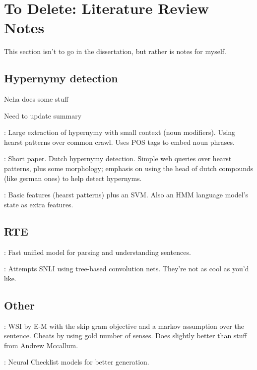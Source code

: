 \chapter{To Delete: Literature Review Notes}

{This section isn't to go in the dissertation, but rather is notes
for myself.}

\section{Hypernymy detection}

\cite{nayak:2015:techreport} Neha does some stuff

\cite{vylomova:2016:acl} Need to update summary

\cite{seitner:2016:lrec}: Large extraction of hypernymy with small context (noun
modifiers). Using hearst patterns over common crawl. Uses POS tags to embed
noun phrases.

\cite{sang:2007:acl}: Short paper. Dutch hypernymy detection. Simple web
queries over hearst patterns, plus some morphology; emphasis on using the head
of dutch compounds (like german ones) to help detect hypernyms.

\cite{ritter:2009:aaai}: Basic features (hearst patterns) plus an SVM. Also an
HMM language model's state as extra features.

\section{RTE}

\cite{bowman:2016:acl}: Fast unified model for parsing and understanding
sentences.

\cite{mou:2016:acl}: Attempts SNLI using tree-based convolution nets. They're
not as cool as you'd like.

\section{Other}

\cite{qiu:2016:emnlp}: WSI by E-M with the skip gram objective and a markov
assumption over the sentence. Cheats by using gold number of senses. Does
slightly better than stuff from Andrew Mccallum.

\cite{kiddon:2016:emnlp}: Neural Checklist models for better generation.


